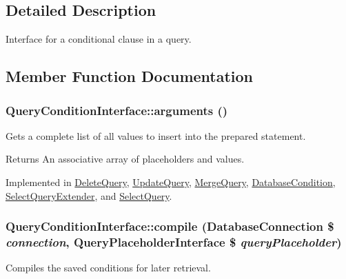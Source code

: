 \subsection{Detailed Description}
Interface for a conditional clause in a query. 

\subsection{Member Function Documentation}
\hypertarget{interfaceQueryConditionInterface_ac2349e02d5332412182cf472ba1a1b1e}{
\subsubsection[{arguments}]{\setlength{\rightskip}{0pt plus 5cm}QueryConditionInterface::arguments ()}}
\label{interfaceQueryConditionInterface_ac2349e02d5332412182cf472ba1a1b1e}
Gets a complete list of all values to insert into the prepared statement.

\begin{DoxyReturn}{Returns}
An associative array of placeholders and values. 
\end{DoxyReturn}


Implemented in \hyperlink{classDeleteQuery_a16b4a6f2068378e594ed3d99e8e05a98}{DeleteQuery}, \hyperlink{classUpdateQuery_a2c4a12ea4382257466781f78aa813d06}{UpdateQuery}, \hyperlink{classMergeQuery_aa059b4fd2916e10075582091bfa03975}{MergeQuery}, \hyperlink{classDatabaseCondition_abfffa491de7087f1521e9868915f0169}{DatabaseCondition}, \hyperlink{classSelectQueryExtender_a7095c455524c42ec48e49719ecc53d0c}{SelectQueryExtender}, and \hyperlink{classSelectQuery_ada38099d692203d261f6a6b708a9635c}{SelectQuery}.\hypertarget{interfaceQueryConditionInterface_ad409672ac9ac50787eec52ecdf5a60b1}{
\subsubsection[{compile}]{\setlength{\rightskip}{0pt plus 5cm}QueryConditionInterface::compile ({\bf DatabaseConnection} \$ {\em connection}, \/  {\bf QueryPlaceholderInterface} \$ {\em queryPlaceholder})}}
\label{interfaceQueryConditionInterface_ad409672ac9ac50787eec52ecdf5a60b1}
Compiles the saved conditions for later retrieval.

